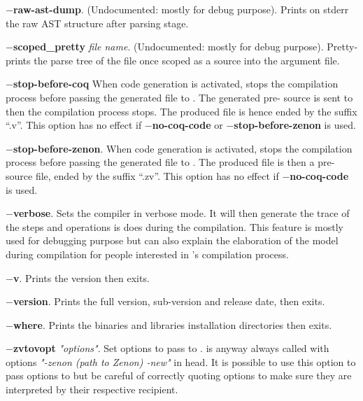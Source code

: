 \begin{compact-itemize}
  \item[*] {\bf $-$raw-ast-dump}. (Undocumented: mostly for debug
    purpose). Prints on stderr the raw AST structure after parsing
    stage.

  \item[*] {\bf $-$scoped\_pretty} {\em file name}. (Undocumented:
    mostly for debug purpose). Pretty-prints the parse tree of the
    {\focal} file once scoped as a {\focal} source into the argument
    file.

  \item[*] {\bf $-$stop-before-coq} When {\coq} code generation is
    activated, stops the compilation process before passing the
    generated file to {\coq}. The generated pre-{\coq} source is sent to
    {\zenon} then the compilation process stops. The produced file is
    hence ended by the suffix ``.v''. This option has no effect if
    {\bf $-$no-coq-code} or {\bf $-$stop-before-zenon} is used.

   \item[*] {\bf $-$stop-before-zenon}. When {\coq} code generation is
     activated, stops the compilation process before passing the
     generated file to {\zenon}. The produced file is then a pre-{\coq}
     source file, ended by the suffix ``.zv''. This option has no
     effect if {\bf $-$no-coq-code} is used.

  \item[*] {\bf $-$verbose}. Sets the compiler in verbose mode. It
    will then generate the trace of the steps and operations is does
    during the compilation. This feature is mostly used for debugging
    purpose but can also explain the elaboration of the model during
    compilation for people interested in {\focal}'s compilation
    process.

  \item[*] {\bf $-$v}. Prints the {\focal} version then exits.

  \item[*] {\bf $-$version}. Prints the full {\focal} version,
    sub-version and release date, then exits.

  \item[*] {\bf $-$where}. Prints the binaries and libraries
    installation directories then exits.

  \item[*] {\bf $-$zvtovopt} {\em "options"}. Set options to pass to {\zvtov}.
    {\zvtov} is anyway always called with options
    {\em "-zenon (path to Zenon) -new"} in head. It is possible to use this
    option to pass options to {\zenon} but be careful of correctly quoting
    options to make sure they are interpreted by their respective recipient.


\end{compact-itemize}
